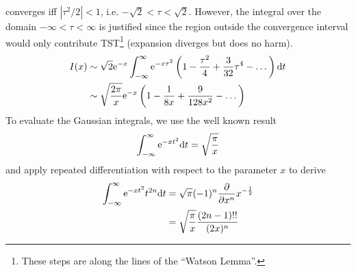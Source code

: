 converges iff $|\tau^2/2|<1$, i.e. $-\sqrt{2}<\tau <\sqrt{2}$. However, the integral over the domain $-\infty < \tau < \infty$ is justified since the region outside the convergence interval would only contribute TST\footnote{These steps are along the lines of the ``Watson Lemma''.} (expansion diverges but does no harm).
\begin{align*}
	I(x) &\sim \sqrt{2}\mathrm{e}^{-x} \int_{-\infty}^{\infty} \mathrm{e}^{-x \tau^2} \left(1 - \frac{\tau^2}{4} + \frac{3}{32}\tau^4-\dots \right) \mathrm{d} t \\
	& \sim \sqrt{\frac{2\pi}{x}}\mathrm{e}^{-x} \left(1 - \frac{1}{8x} + \frac{9}{128x^2}-\dots \right)
\end{align*}
To evaluate the Gaussian integrals, we use the well known result
\begin{gather*}
	\int_{-\infty}^{\infty} \mathrm{e}^{-xt^2} \mathrm{d} t = \sqrt{\frac{\pi}{x}}
\end{gather*}
and apply repeated differentiation with respect to the parameter $x$ to derive 
\begin{align}
	\int_{-\infty}^{\infty} \mathrm{e}^{-xt^2} t^{2n} \mathrm{d} t &= \sqrt{\pi}(-1)^n \frac{\partial}{\partial x^n} x^{-\frac{1}{2}} \\
	&= \sqrt{\frac{\pi}{x}} \frac{(2n-1)!!}{(2x)^n} \nonumber 
\end{align}

